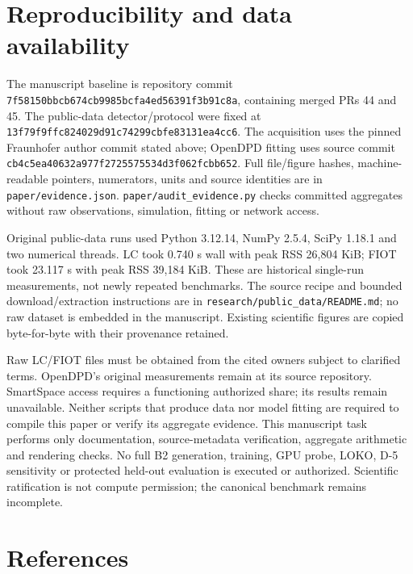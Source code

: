 \documentclass[
  10pt,
]{article}
\begin{document}
\section{Reproducibility and data
availability}\label{reproducibility-and-data-availability}

The manuscript baseline is repository commit
\texttt{7f58150bbcb674cb9985bcfa4ed56391f3b91c8a}, containing merged PRs
44 and 45. The public-data detector/protocol were fixed at
\texttt{13f79f9ffc824029d91c74299cbfe83131ea4cc6}. The acquisition uses
the pinned Fraunhofer author commit stated above; OpenDPD fitting uses
source commit \texttt{cb4c5ea40632a977f2725575534d3f062fcbb652}. Full
file/figure hashes, machine-readable pointers, numerators, units and
source identities are in \texttt{paper/evidence.json}.
\texttt{paper/audit\_evidence.py} checks committed aggregates without
raw observations, simulation, fitting or network access.

Original public-data runs used Python 3.12.14, NumPy 2.5.4, SciPy 1.18.1
and two numerical threads. LC took 0.740 s wall with peak RSS 26,804
KiB; FIOT took 23.117 s with peak RSS 39,184 KiB. These are historical
single-run measurements, not newly repeated benchmarks. The source
recipe and bounded download/extraction instructions are in
\texttt{research/public\_data/README.md}; no raw dataset is embedded in
the manuscript. Existing scientific figures are copied byte-for-byte
with their provenance retained.

Raw LC/FIOT files must be obtained from the cited owners subject to
clarified terms. OpenDPD's original measurements remain at its source
repository. SmartSpace access requires a functioning authorized share;
its results remain unavailable. Neither scripts that produce data nor
model fitting are required to compile this paper or verify its aggregate
evidence. This manuscript task performs only documentation,
source-metadata verification, aggregate arithmetic and rendering checks.
No full B2 generation, training, GPU probe, LOKO, D-5 sensitivity or
protected held-out evaluation is executed or authorized. Scientific
ratification is not compute permission; the canonical benchmark remains
incomplete.

\section{References}\label{references}
\end{document}
